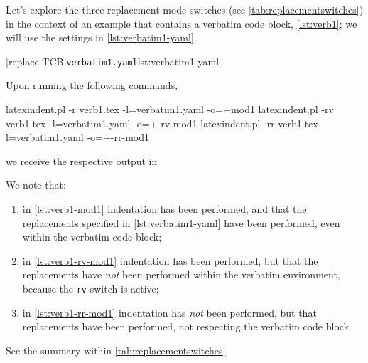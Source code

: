 \documentclass[10pt]{article}
\begin{document}
 \begin{example}
 Let's explore the three replacement mode switches (see \vref{tab:replacementswitches})
 in the context of an example that contains a verbatim code block, \cref{lst:verb1}; we
 will use the settings in \cref{lst:verbatim1-yaml}.

 \begin{cmhtcbraster}
  [replace-TCB]{\texttt{verbatim1.yaml}}{lst:verbatim1-yaml}
 \end{cmhtcbraster}

 Upon running the following commands,   
   

 \begin{commandshell}
latexindent.pl -r verb1.tex -l=verbatim1.yaml -o=+mod1
latexindent.pl -rv verb1.tex -l=verbatim1.yaml -o=+-rv-mod1
latexindent.pl -rr verb1.tex -l=verbatim1.yaml -o=+-rr-mod1
\end{commandshell}

 we receive the respective output in 

 \begin{cmhtcbraster}[raster columns=3,
   raster left skip=-3.75cm,
   raster right skip=-2cm,]
 \end{cmhtcbraster}
 \end{example}

 We note that:
 \begin{enumerate}
  \item in \cref{lst:verb1-mod1} indentation has been performed, and that the
        replacements specified in \cref{lst:verbatim1-yaml} have been performed, even
        within the verbatim code block;
  \item in \cref{lst:verb1-rv-mod1} indentation has been performed, but that the
        replacements have \emph{not} been performed within the verbatim environment,
        because the \texttt{rv} switch is active;
  \item in \cref{lst:verb1-rr-mod1} indentation has \emph{not} been performed, but that
        replacements have been performed, not respecting the verbatim code block.
 \end{enumerate}
 See the summary within \vref{tab:replacementswitches}.
\end{document}
